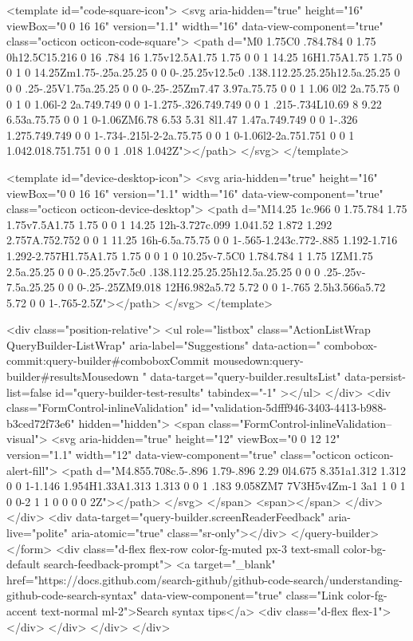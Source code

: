 <template id="code-square-icon">
  <svg aria-hidden="true" height="16" viewBox="0 0 16 16" version="1.1" width="16" data-view-component="true" class="octicon octicon-code-square">
    <path d="M0 1.75C0 .784.784 0 1.75 0h12.5C15.216 0 16 .784 16 1.75v12.5A1.75 1.75 0 0 1 14.25 16H1.75A1.75 1.75 0 0 1 0 14.25Zm1.75-.25a.25.25 0 0 0-.25.25v12.5c0 .138.112.25.25.25h12.5a.25.25 0 0 0 .25-.25V1.75a.25.25 0 0 0-.25-.25Zm7.47 3.97a.75.75 0 0 1 1.06 0l2 2a.75.75 0 0 1 0 1.06l-2 2a.749.749 0 0 1-1.275-.326.749.749 0 0 1 .215-.734L10.69 8 9.22 6.53a.75.75 0 0 1 0-1.06ZM6.78 6.53 5.31 8l1.47 1.47a.749.749 0 0 1-.326 1.275.749.749 0 0 1-.734-.215l-2-2a.75.75 0 0 1 0-1.06l2-2a.751.751 0 0 1 1.042.018.751.751 0 0 1 .018 1.042Z"></path>
</svg>
</template>

<template id="device-desktop-icon">
  <svg aria-hidden="true" height="16" viewBox="0 0 16 16" version="1.1" width="16" data-view-component="true" class="octicon octicon-device-desktop">
    <path d="M14.25 1c.966 0 1.75.784 1.75 1.75v7.5A1.75 1.75 0 0 1 14.25 12h-3.727c.099 1.041.52 1.872 1.292 2.757A.752.752 0 0 1 11.25 16h-6.5a.75.75 0 0 1-.565-1.243c.772-.885 1.192-1.716 1.292-2.757H1.75A1.75 1.75 0 0 1 0 10.25v-7.5C0 1.784.784 1 1.75 1ZM1.75 2.5a.25.25 0 0 0-.25.25v7.5c0 .138.112.25.25.25h12.5a.25.25 0 0 0 .25-.25v-7.5a.25.25 0 0 0-.25-.25ZM9.018 12H6.982a5.72 5.72 0 0 1-.765 2.5h3.566a5.72 5.72 0 0 1-.765-2.5Z"></path>
</svg>
</template>

        <div class="position-relative">
                <ul
                  role="listbox"
                  class="ActionListWrap QueryBuilder-ListWrap"
                  aria-label="Suggestions"
                  data-action="
                    combobox-commit:query-builder#comboboxCommit
                    mousedown:query-builder#resultsMousedown
                  "
                  data-target="query-builder.resultsList"
                  data-persist-list=false
                  id="query-builder-test-results"
                  tabindex="-1"
                ></ul>
        </div>
      <div class="FormControl-inlineValidation" id="validation-5dfff946-3403-4413-b988-b3ced72f73e6" hidden="hidden">
        <span class="FormControl-inlineValidation--visual">
          <svg aria-hidden="true" height="12" viewBox="0 0 12 12" version="1.1" width="12" data-view-component="true" class="octicon octicon-alert-fill">
    <path d="M4.855.708c.5-.896 1.79-.896 2.29 0l4.675 8.351a1.312 1.312 0 0 1-1.146 1.954H1.33A1.313 1.313 0 0 1 .183 9.058ZM7 7V3H5v4Zm-1 3a1 1 0 1 0 0-2 1 1 0 0 0 0 2Z"></path>
</svg>
        </span>
        <span></span>
</div>    </div>
    <div data-target="query-builder.screenReaderFeedback" aria-live="polite" aria-atomic="true" class="sr-only"></div>
</query-builder></form>
          <div class="d-flex flex-row color-fg-muted px-3 text-small color-bg-default search-feedback-prompt">
            <a target="_blank" href="https://docs.github.com/search-github/github-code-search/understanding-github-code-search-syntax" data-view-component="true" class="Link color-fg-accent text-normal ml-2">Search syntax tips</a>            <div class="d-flex flex-1"></div>
          </div>
        </div>
</div>

